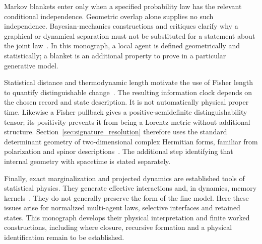 Markov blankets enter only when a specified probability law has the relevant conditional independence. Geometric overlap alone supplies no such independence. Bayesian-mechanics constructions and critiques clarify why a graphical or dynamical separation must not be substituted for a statement about the joint law~\cite{dacosta2021bayesian,biehl2021technical,bruineberg2022emperor}. In this monograph, a local agent is defined geometrically and statistically; a blanket is an additional property to prove in a particular generative model.

Statistical distance and thermodynamic length motivate the use of Fisher length to quantify distinguishable change~\cite{Wootters1981,SalamonBerry1983,Crooks2007}. The resulting information clock depends on the chosen record and state description. It is not automatically physical proper time. Likewise a Fisher pullback gives a positive-semidefinite distinguishability tensor; its positivity prevents it from being a Lorentz metric without additional structure. Section~\ref{sec:signature_resolution} therefore uses the standard determinant geometry of two-dimensional complex Hermitian forms, familiar from polarization and spinor descriptions~\cite{HanKimNoz1997Stokes,SimonEtAl2006LorentzTurns}. The additional step identifying that internal geometry with spacetime is stated separately.

Finally, exact marginalization and projected dynamics are established tools of statistical physics. They generate effective interactions and, in dynamics, memory kernels~\cite{Zwanzig1961Memory,Mori1965Transport}. They do not generally preserve the form of the fine model. Here these issues arise for normalized multi-agent laws, selective interfaces and retained states. This monograph develops their physical interpretation and finite worked constructions, including where closure, recursive formation and a physical identification remain to be established.
